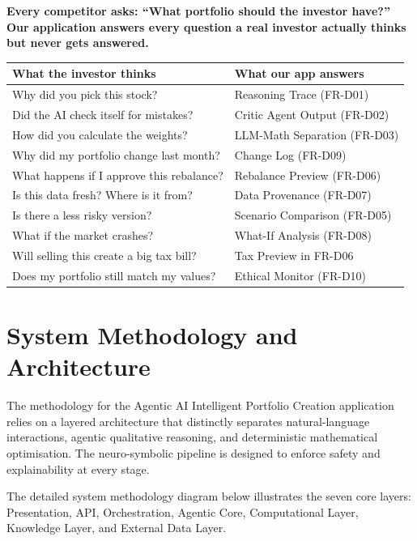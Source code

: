 \documentclass[12pt, a4paper, openany, oneside]{report}
\begin{document}
\begin{framed}
\textbf{Every competitor asks: ``What portfolio should the investor have?''}\\
\textbf{Our application answers every question a real investor actually thinks but never gets answered.}

\vspace{0.5em}
\begin{center}
\begin{tabular}{|p{6.2cm}|p{6.2cm}|}
\hline
\textbf{What the investor thinks} & \textbf{What our app answers} \\
\hline
Why did you pick this stock? & Reasoning Trace (FR-D01) \\
Did the AI check itself for mistakes? & Critic Agent Output (FR-D02) \\
How did you calculate the weights? & LLM-Math Separation (FR-D03) \\
Why did my portfolio change last month? & Change Log (FR-D09) \\
What happens if I approve this rebalance? & Rebalance Preview (FR-D06) \\
Is this data fresh? Where is it from? & Data Provenance (FR-D07) \\
Is there a less risky version? & Scenario Comparison (FR-D05) \\
What if the market crashes? & What-If Analysis (FR-D08) \\
Will selling this create a big tax bill? & Tax Preview in FR-D06 \\
Does my portfolio still match my values? & Ethical Monitor (FR-D10) \\
\hline
\end{tabular}
\end{center}
\end{framed}

\section{System Methodology and Architecture}

The methodology for the Agentic AI Intelligent Portfolio Creation application relies on a layered architecture that distinctly separates natural-language interactions, agentic qualitative reasoning, and deterministic mathematical optimisation. The neuro-symbolic pipeline is designed to enforce safety and explainability at every stage.

The detailed system methodology diagram below illustrates the seven core layers: Presentation, API, Orchestration, Agentic Core, Computational Layer, Knowledge Layer, and External Data Layer.
\end{document}
